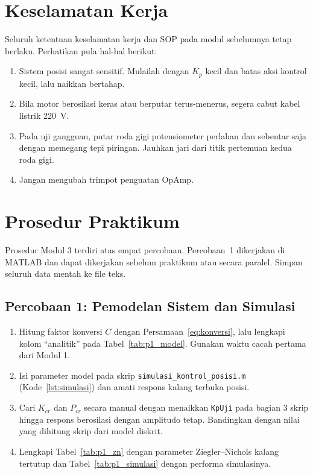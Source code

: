 \documentclass[11pt,a4paper]{article}
\newcommand{\prog}[1]{\texttt{#1}}
\begin{document}
\section{Keselamatan Kerja}
Seluruh ketentuan keselamatan kerja dan SOP pada modul sebelumnya tetap berlaku. Perhatikan pula hal-hal berikut:
\begin{enumerate}
\item Sistem posisi sangat sensitif. Mulailah dengan $K_p$ kecil dan batas aksi kontrol kecil, lalu naikkan bertahap.
\item Bila motor berosilasi keras atau berputar terus-menerus, segera cabut kabel listrik 220~V.
\item Pada uji gangguan, putar roda gigi potensiometer perlahan dan sebentar saja dengan memegang tepi piringan. Jauhkan jari dari titik pertemuan kedua roda gigi.
\item Jangan mengubah trimpot penguatan OpAmp.
\end{enumerate}

\section{Prosedur Praktikum}
Prosedur Modul 3 terdiri atas empat percobaan. Percobaan~1 dikerjakan di MATLAB dan dapat dikerjakan sebelum praktikum atau secara paralel. Simpan seluruh data mentah ke file teks.

\subsection{Percobaan 1: Pemodelan Sistem dan Simulasi}
\begin{enumerate}
\item Hitung faktor konversi $C$ dengan Persamaan~\eqref{eq:konversi}, lalu lengkapi kolom ``analitik'' pada Tabel~\ref{tab:p1_model}. Gunakan waktu cacah pertama dari Modul 1.
\item Isi parameter model pada skrip \prog{simulasi\_kontrol\_posisi.m} (Kode~\ref{lst:simulasi}) dan amati respons kalang terbuka posisi.
\item Cari $K_{cr}$ dan $P_{cr}$ secara manual dengan menaikkan \texttt{KpUji} pada bagian 3 skrip hingga respons berosilasi dengan amplitudo tetap. Bandingkan dengan nilai yang dihitung skrip dari model diskrit.
\item Lengkapi Tabel~\ref{tab:p1_zn} dengan parameter Ziegler--Nichols kalang tertutup dan Tabel~\ref{tab:p1_simulasi} dengan performa simulasinya.
\end{enumerate}
\end{document}
